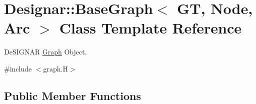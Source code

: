 \hypertarget{class_designar_1_1_base_graph}{}\section{Designar\+:\+:Base\+Graph$<$ GT, Node, Arc $>$ Class Template Reference}
\label{class_designar_1_1_base_graph}


De\+S\+I\+G\+N\+AR \hyperlink{class_designar_1_1_graph}{Graph} Object.  




{\ttfamily \#include $<$graph.\+H$>$}

\subsection*{Public Member Functions}
